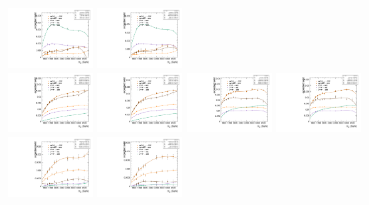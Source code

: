 \begin{figure}[htbp]
  \includegraphics[width=0.2\textwidth]{fig/analysis/paramSignalYield_NonVBFSig_mu_LP_bb_DEtaHi.pdf}
  \includegraphics[width=0.2\textwidth]{fig/analysis/paramSignalYield_NonVBFSig_e_LP_bb_DEtaHi.pdf}\\
  \includegraphics[width=0.2\textwidth]{fig/analysis/paramSignalYield_NonVBFSig_mu_HP_nobb_DEtaHi.pdf}
  \includegraphics[width=0.2\textwidth]{fig/analysis/paramSignalYield_NonVBFSig_e_HP_nobb_DEtaHi.pdf}
  \includegraphics[width=0.2\textwidth]{fig/analysis/paramSignalYield_NonVBFSig_mu_LP_nobb_DEtaHi.pdf}
  \includegraphics[width=0.2\textwidth]{fig/analysis/paramSignalYield_NonVBFSig_e_LP_nobb_DEtaHi.pdf}\\
  \includegraphics[width=0.2\textwidth]{fig/analysis/paramSignalYield_NonVBFSig_mu_HP_vbf_DEtaHi.pdf}
  \includegraphics[width=0.2\textwidth]{fig/analysis/paramSignalYield_NonVBFSig_e_HP_vbf_DEtaHi.pdf}

\end{figure}
